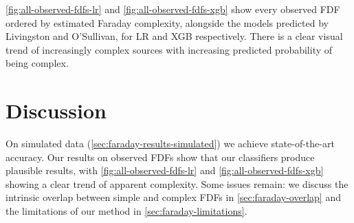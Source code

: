     \autoref{fig:all-observed-fdfs-lr} and \autoref{fig:all-observed-fdfs-xgb} show every observed FDF ordered by estimated Faraday complexity, alongside the models predicted by Livingston and O'Sullivan, for LR and XGB respectively. There is a clear visual trend of increasingly complex sources with increasing predicted probability of being complex. %

\section{Discussion}
\label{sec:faraday-discussion}


  On simulated data (\autoref{sec:faraday-results-simulated}) we achieve state-of-the-art accuracy. Our results on observed FDFs show that our classifiers produce plausible results, with \autoref{fig:all-observed-fdfs-lr} and \autoref{fig:all-observed-fdfs-xgb} showing a clear trend of apparent complexity. Some issues remain: we discuss the intrinsic overlap between simple and complex FDFs in \autoref{sec:faraday-overlap} and the limitations of our method in \autoref{sec:faraday-limitations}.



